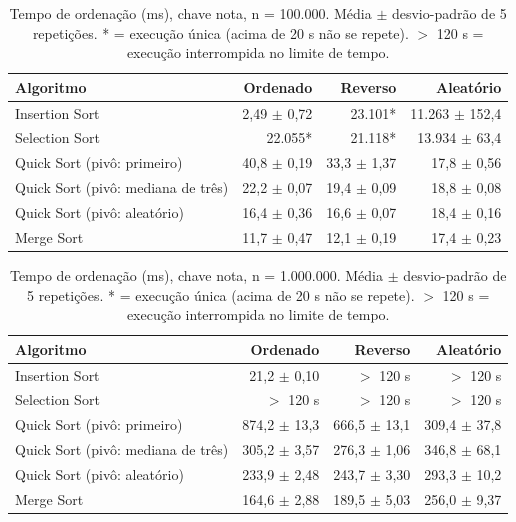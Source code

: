 \begin{table}[ht]
\centering
\caption{Tempo de ordena\c{c}\~ao (ms), chave nota, n = 100.000. M\'edia $\pm$ desvio-padr\~ao de 5 repeti\c{c}\~oes. * = execu\c{c}\~ao \'unica (acima de 20 s n\~ao se repete). $>$ 120 s = execu\c{c}\~ao interrompida no limite de tempo. }
\label{tab:tempo-nota-100000}
\begin{tabular}{lrrr}
\hline
Algoritmo & Ordenado & Reverso & Aleat\'orio \\
\hline
Insertion Sort & 2,49 $\pm$ 0,72 & 23.101* & 11.263 $\pm$ 152,4 \\
Selection Sort & 22.055* & 21.118* & 13.934 $\pm$ 63,4 \\
Quick Sort (piv\^o: primeiro) & 40,8 $\pm$ 0,19 & 33,3 $\pm$ 1,37 & 17,8 $\pm$ 0,56 \\
Quick Sort (piv\^o: mediana de tr\^es) & 22,2 $\pm$ 0,07 & 19,4 $\pm$ 0,09 & 18,8 $\pm$ 0,08 \\
Quick Sort (piv\^o: aleat\'orio) & 16,4 $\pm$ 0,36 & 16,6 $\pm$ 0,07 & 18,4 $\pm$ 0,16 \\
Merge Sort & 11,7 $\pm$ 0,47 & 12,1 $\pm$ 0,19 & 17,4 $\pm$ 0,23 \\
\hline
\end{tabular}
\end{table}

\begin{table}[ht]
\centering
\caption{Tempo de ordena\c{c}\~ao (ms), chave nota, n = 1.000.000. M\'edia $\pm$ desvio-padr\~ao de 5 repeti\c{c}\~oes. * = execu\c{c}\~ao \'unica (acima de 20 s n\~ao se repete). $>$ 120 s = execu\c{c}\~ao interrompida no limite de tempo. }
\label{tab:tempo-nota-1000000}
\begin{tabular}{lrrr}
\hline
Algoritmo & Ordenado & Reverso & Aleat\'orio \\
\hline
Insertion Sort & 21,2 $\pm$ 0,10 & $>$ 120 s & $>$ 120 s \\
Selection Sort & $>$ 120 s & $>$ 120 s & $>$ 120 s \\
Quick Sort (piv\^o: primeiro) & 874,2 $\pm$ 13,3 & 666,5 $\pm$ 13,1 & 309,4 $\pm$ 37,8 \\
Quick Sort (piv\^o: mediana de tr\^es) & 305,2 $\pm$ 3,57 & 276,3 $\pm$ 1,06 & 346,8 $\pm$ 68,1 \\
Quick Sort (piv\^o: aleat\'orio) & 233,9 $\pm$ 2,48 & 243,7 $\pm$ 3,30 & 293,3 $\pm$ 10,2 \\
Merge Sort & 164,6 $\pm$ 2,88 & 189,5 $\pm$ 5,03 & 256,0 $\pm$ 9,37 \\
\hline
\end{tabular}
\end{table}


